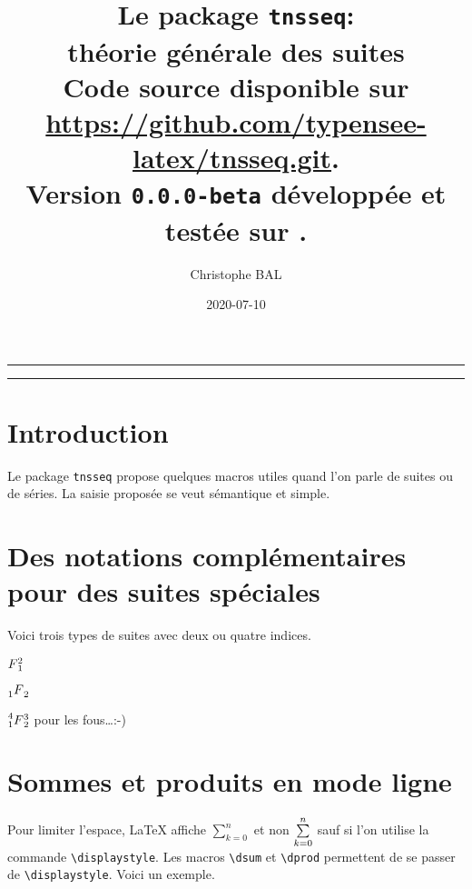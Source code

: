 \documentclass[12pt,a4paper]{article}
\newcommand\env[1]{\texttt{#1}}
\newcommand\macro[1]{\env{\textbackslash{}#1}}
\theoremstyle{definition}
\begin{document}
\renewcommand\labelitemi{\raisebox{0.125em}{\tiny\textbullet}}
\renewcommand{\labelitemii}{---}

\title{  %
	Le package \texttt{tnsseq}:\\%
	théorie générale des suites\\%
	{\footnotesize Code source disponible sur \url{https://github.com/typensee-latex/tnsseq.git}.}\\%
{\footnotesize Version \texttt{0.0.0-beta} développée et testée sur \macosxname{}.}%
}
\author{Christophe BAL}
\date{2020-07-10}

\maketitle


\vspace{2em}

\hrule

\tableofcontents

\vspace{1.5em}

\hrule

\newpage

\section{Introduction}

Le package \verb+tnsseq+ propose quelques macros utiles quand l'on parle de suites ou de séries. La saisie proposée se veut sémantique et simple.
\section{Des notations complémentaires pour des suites spéciales}

Voici trois types de suites avec deux ou quatre indices.

\begin{latexex}
$\seqplus{F}{1}{2}$

$\seqhypergeo{F}{1}{2}$

$\seqsuprageo{F}{1}{2}{3}{4}$
pour les fous\dots :-)
\end{latexex}


\section{Sommes et produits en mode ligne}

Pour limiter l'espace, \LaTeX{} affiche $\sum_{k=0}^{n}$ et non $\dsum_{k=0}^{n}$ sauf si l'on utilise la commande \macro{displaystyle}.
Les macros \macro{dsum} et \macro{dprod} permettent de se passer de \macro{displaystyle}.
Voici un exemple.
\end{document}
